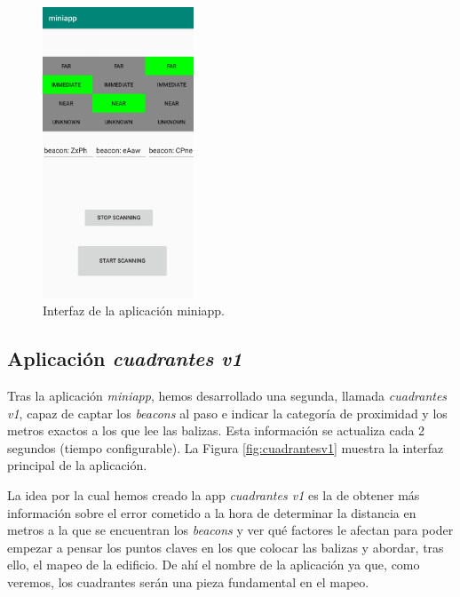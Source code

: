 \begin{figure}[t]
	\centering
	\includegraphics[width=0.4\textwidth]{Imagenes/Descripciondeltrabajo/miniapp}
	\caption{Interfaz de la aplicación miniapp. }
	\label{fig:miniapp}
\end{figure}

\subsection{Aplicación \textit{cuadrantes v1}}
Tras la aplicación \textit{miniapp}, hemos desarrollado una segunda, llamada \textit{cuadrantes v1}, capaz de captar los \textit{beacons} al paso e indicar la categoría de proximidad y los metros exactos a los que lee las balizas. Esta información se actualiza cada 2 segundos (tiempo configurable). La Figura \ref{fig:cuadrantesv1} muestra la interfaz principal de la aplicación.

La idea por la cual hemos creado la app \textit{cuadrantes v1} es la de obtener más información sobre el error cometido a la hora de determinar la distancia en metros a la que se encuentran los \textit{beacons} y ver qué factores le afectan para poder empezar a pensar los puntos claves en los que colocar las balizas y abordar, tras ello, el mapeo de la edificio. De ahí el nombre de la aplicación ya que, como veremos, los cuadrantes serán una pieza fundamental en el mapeo.

